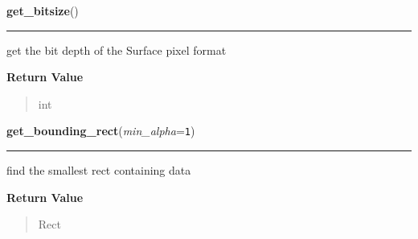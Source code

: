     \label{pygame:Surface:get_bitsize}

    \vspace{0.5ex}

\hspace{.8\funcindent}\begin{boxedminipage}{\funcwidth}

    \raggedright \textbf{get\_bitsize}()

    \vspace{-1.5ex}

    \rule{\textwidth}{0.5\fboxrule}
\setlength{\parskip}{2ex}
    get the bit depth of the Surface pixel format

\setlength{\parskip}{1ex}
      \textbf{Return Value}
    \vspace{-1ex}

      \begin{quote}
      int

      \end{quote}

    \end{boxedminipage}

    \label{pygame:Surface:get_bounding_rect}

    \vspace{0.5ex}

\hspace{.8\funcindent}\begin{boxedminipage}{\funcwidth}

    \raggedright \textbf{get\_bounding\_rect}(\textit{min\_alpha}={\tt  1})

    \vspace{-1.5ex}

    \rule{\textwidth}{0.5\fboxrule}
\setlength{\parskip}{2ex}
    find the smallest rect containing data

\setlength{\parskip}{1ex}
      \textbf{Return Value}
    \vspace{-1ex}

      \begin{quote}
      Rect

      \end{quote}

    \end{boxedminipage}

    \label{pygame:Surface:get_buffer}

